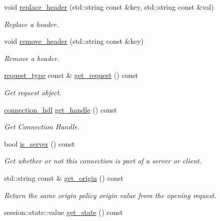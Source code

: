 \begin{DoxyCompactItemize}
void \hyperlink{classwebsocketpp_1_1connection_a96e4adcdb9b3473ca96e2aac27ff7147}{replace\+\_\+header} (std\+::string const \&key, std\+::string const \&val)
\begin{DoxyCompactList}\small\item\em Replace a header. \end{DoxyCompactList}\item 
void \hyperlink{classwebsocketpp_1_1connection_a63094895d9dcfb4d10974ae97ea319a1}{remove\+\_\+header} (std\+::string const \&key)
\begin{DoxyCompactList}\small\item\em Remove a header. \end{DoxyCompactList}\item 
\hyperlink{classwebsocketpp_1_1http_1_1parser_1_1request}{request\+\_\+type} const  \& \hyperlink{classwebsocketpp_1_1connection_a9d1a9846185e34cbe9ecada12b30e076}{get\+\_\+request} () const
\begin{DoxyCompactList}\small\item\em Get request object. \end{DoxyCompactList}\item 
\hyperlink{namespacewebsocketpp_a6b3d26a10ee7229b84b776786332631d}{connection\+\_\+hdl} \hyperlink{classwebsocketpp_1_1connection_a6a28147e2f3f4c1fb37f29a234e772bc}{get\+\_\+handle} () const
\begin{DoxyCompactList}\small\item\em Get Connection Handle. \end{DoxyCompactList}\item 
bool \hyperlink{classwebsocketpp_1_1connection_ab248ee632b5b4d9998fec4328510f445}{is\+\_\+server} () const
\begin{DoxyCompactList}\small\item\em Get whether or not this connection is part of a server or client. \end{DoxyCompactList}\item 
std\+::string const  \& \hyperlink{classwebsocketpp_1_1connection_a428a8ee0bd94a7dadf6a4831c756ead3}{get\+\_\+origin} () const
\begin{DoxyCompactList}\small\item\em Return the same origin policy origin value from the opening request. \end{DoxyCompactList}\item 
session\+::state\+::value \hyperlink{classwebsocketpp_1_1connection_a9001efbd5b467ccf3e5e601bb18e4971}{get\+\_\+state} () const

\end{DoxyCompactItemize}
